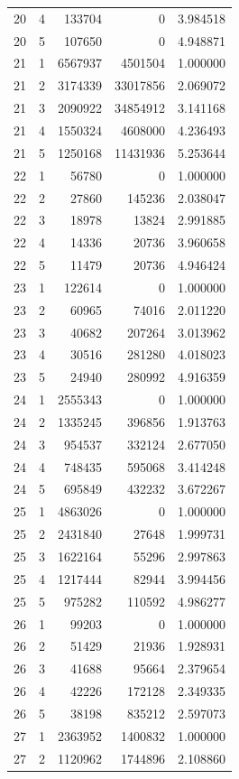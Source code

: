 \begin{longtable}{rrrrr}
20 & 4 & 133704 & 0 & 3.984518 \\
20 & 5 & 107650 & 0 & 4.948871 \\
21 & 1 & 6567937 & 4501504 & 1.000000 \\
21 & 2 & 3174339 & 33017856 & 2.069072 \\
21 & 3 & 2090922 & 34854912 & 3.141168 \\
21 & 4 & 1550324 & 4608000 & 4.236493 \\
21 & 5 & 1250168 & 11431936 & 5.253644 \\
22 & 1 & 56780 & 0 & 1.000000 \\
22 & 2 & 27860 & 145236 & 2.038047 \\
22 & 3 & 18978 & 13824 & 2.991885 \\
22 & 4 & 14336 & 20736 & 3.960658 \\
22 & 5 & 11479 & 20736 & 4.946424 \\
23 & 1 & 122614 & 0 & 1.000000 \\
23 & 2 & 60965 & 74016 & 2.011220 \\
23 & 3 & 40682 & 207264 & 3.013962 \\
23 & 4 & 30516 & 281280 & 4.018023 \\
23 & 5 & 24940 & 280992 & 4.916359 \\
24 & 1 & 2555343 & 0 & 1.000000 \\
24 & 2 & 1335245 & 396856 & 1.913763 \\
24 & 3 & 954537 & 332124 & 2.677050 \\
24 & 4 & 748435 & 595068 & 3.414248 \\
24 & 5 & 695849 & 432232 & 3.672267 \\
25 & 1 & 4863026 & 0 & 1.000000 \\
25 & 2 & 2431840 & 27648 & 1.999731 \\
25 & 3 & 1622164 & 55296 & 2.997863 \\
25 & 4 & 1217444 & 82944 & 3.994456 \\
25 & 5 & 975282 & 110592 & 4.986277 \\
26 & 1 & 99203 & 0 & 1.000000 \\
26 & 2 & 51429 & 21936 & 1.928931 \\
26 & 3 & 41688 & 95664 & 2.379654 \\
26 & 4 & 42226 & 172128 & 2.349335 \\
26 & 5 & 38198 & 835212 & 2.597073 \\
27 & 1 & 2363952 & 1400832 & 1.000000 \\
27 & 2 & 1120962 & 1744896 & 2.108860 \\

\end{longtable}
